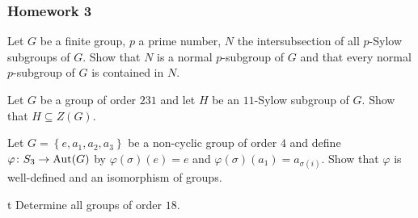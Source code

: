 \subsubsection{Homework 3}
\setcounter{exercise}{0}
\setcounter{equation}{0}

\begin{problem}
  Let \(G\) be a finite group, \(p\) a prime number, \(N\) the
  intersubsection of all \(p\)-Sylow subgroups of \(G\). Show that \(N\) is
  a normal \(p\)-subgroup of \(G\) and that every normal \(p\)-subgroup of
  \(G\) is contained in \(N\).
\end{problem}
\begin{solution}
\end{solution}

\begin{problem}
  Let \(G\) be a group of order \(231\) and let \(H\) be an \(11\)-Sylow
  subgroup of \(G\). Show that \(H\subseteq Z(G)\).
\end{problem}
\begin{solution}
\end{solution}

\begin{problem}
  Let \(G=\left\{e,a_1,a_2,a_3\right\}\) be a non-cyclic group of order
  \(4\) and define \(\varphi\colon S_3\to\operatorname{Aut}(G)\) by
  \(\varphi(\sigma)(e)=e\) and \(\varphi(\sigma)(a_1)=a_{\sigma(i)}\). Show
  that \(\varphi\) is well-defined and an isomorphism of groups.
\end{problem}
\begin{solution}
\end{solution}

\begin{problem}t
  Determine all groups of order \(18\).
\end{problem}
\begin{solution}
\end{solution}


